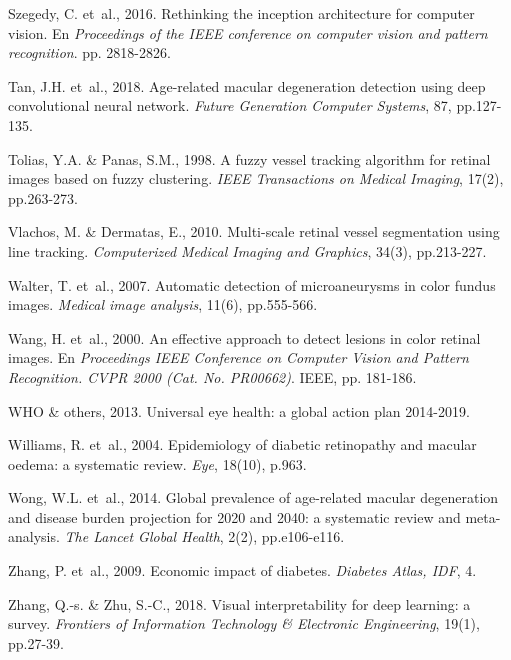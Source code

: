 \documentclass[
  12pt,
  spanish,
  a4paperpaper,
]{report}
\begin{document}
\leavevmode\hypertarget{ref-szegedy2016rethinking}{}%
Szegedy, C. et~al., 2016. Rethinking the inception architecture for
computer vision. En \emph{Proceedings of the IEEE conference on computer
vision and pattern recognition}. pp. 2818-2826.

\leavevmode\hypertarget{ref-tan2018age}{}%
Tan, J.H. et~al., 2018. Age-related macular degeneration detection using
deep convolutional neural network. \emph{Future Generation Computer
Systems}, 87, pp.127-135.

\leavevmode\hypertarget{ref-tolias1998fuzzy}{}%
Tolias, Y.A. \& Panas, S.M., 1998. A fuzzy vessel tracking algorithm for
retinal images based on fuzzy clustering. \emph{IEEE Transactions on
Medical Imaging}, 17(2), pp.263-273.

\leavevmode\hypertarget{ref-vlachos2010multi}{}%
Vlachos, M. \& Dermatas, E., 2010. Multi-scale retinal vessel
segmentation using line tracking. \emph{Computerized Medical Imaging and
Graphics}, 34(3), pp.213-227.

\leavevmode\hypertarget{ref-walter2007automatic}{}%
Walter, T. et~al., 2007. Automatic detection of microaneurysms in color
fundus images. \emph{Medical image analysis}, 11(6), pp.555-566.

\leavevmode\hypertarget{ref-wang2000effective}{}%
Wang, H. et~al., 2000. An effective approach to detect lesions in color
retinal images. En \emph{Proceedings IEEE Conference on Computer Vision
and Pattern Recognition. CVPR 2000 (Cat. No. PR00662)}. IEEE, pp.
181-186.

\leavevmode\hypertarget{ref-world2013universal}{}%
WHO \& others, 2013. Universal eye health: a global action plan
2014-2019.

\leavevmode\hypertarget{ref-williams2004epidemiology}{}%
Williams, R. et~al., 2004. Epidemiology of diabetic retinopathy and
macular oedema: a systematic review. \emph{Eye}, 18(10), p.963.

\leavevmode\hypertarget{ref-wong2014global}{}%
Wong, W.L. et~al., 2014. Global prevalence of age-related macular
degeneration and disease burden projection for 2020 and 2040: a
systematic review and meta-analysis. \emph{The Lancet Global Health},
2(2), pp.e106-e116.

\leavevmode\hypertarget{ref-zhang2009economic}{}%
Zhang, P. et~al., 2009. Economic impact of diabetes. \emph{Diabetes
Atlas, IDF}, 4.

\leavevmode\hypertarget{ref-zhang2018visual}{}%
Zhang, Q.-s. \& Zhu, S.-C., 2018. Visual interpretability for deep
learning: a survey. \emph{Frontiers of Information Technology \&
Electronic Engineering}, 19(1), pp.27-39.
\end{document}
